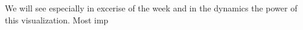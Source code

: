 We will see especially in excerise of the week and in the dynamics the power of this visualization. Most imp